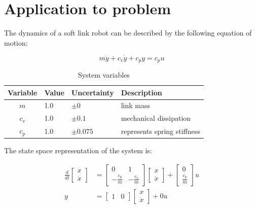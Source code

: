\documentclass{article}
\begin{document}
\section{Application to problem}

The dynamics of a soft link robot can be described by the following equation of motion:

\begin{equation}
    m\ddot{y} + c_v \dot{y} + c_p y = c_p u
\end{equation}

\begin{table}[h]
    \centering
    \begin{tabular}{c|ll|l}
        Variable & Value & Uncertainty & Description \\
        \hline
        $m$ & 1.0 & $\pm0$ & link mass \\
        $c_v$ & 1.0 & $\pm 0.1$ & mechanical dissipation \\
        $c_p$ & 1.0 & $\pm 0.075$ & represents spring stiffness \\
    \end{tabular}
    \caption{System variables}
    \label{tab:example}
\end{table}

The state space representation of the system is:

\begin{align}
    \frac{d}{dt} \begin{bmatrix}
        x \\
        \dot{x}
    \end{bmatrix} &= \begin{bmatrix}
        0 & 1 \\
        -\frac{c_p}{m} & -\frac{c_v}{m}
    \end{bmatrix} \begin{bmatrix}
        x \\
        \dot{x}
    \end{bmatrix} + \begin{bmatrix}
        0 \\
        \frac{c_p}{m}
    \end{bmatrix} u \\
    y &= \begin{bmatrix}
        1 & 0
    \end{bmatrix} \begin{bmatrix}
        x \\
        \dot{x}
    \end{bmatrix} + 0u
\end{align}
\end{document}
